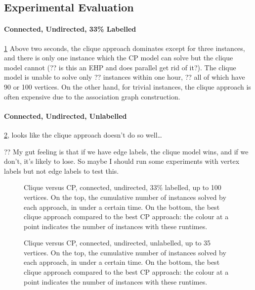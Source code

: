 \documentclass{llncs}
\begin{document}
\subsection{Experimental Evaluation}

\paragraph{Connected, Undirected, 33\% Labelled} \cref{figure:connected-undir33} Above two seconds,
    the clique approach dominates except for three instances, and there is only one instance which
    the CP model can solve but the clique model cannot (?? is this an EHP and does parallel get rid
    of it?). The clique model is unable to solve only ??  instances within one hour, ?? all of which
    have 90 or 100 vertices.  On the other hand, for trivial instances, the clique approach is often
    expensive due to the association graph construction.

\paragraph{Connected, Undirected, Unlabelled} \cref{figure:connected-plain}, looks like the clique
approach doesn't do so well\ldots

?? My gut feeling is that if we have edge labels, the clique model wins, and if we don't, it's
likely to lose. So maybe I should run some experiments with vertex labels but not edge labels to
test this.

\begin{figure}[p]
    \centering
    
    \caption{Clique versus CP, connected, undirected, 33\% labelled, up to 100 vertices. On the top,
        the cumulative number of instances solved by each approach, in under a certain time. On the
        bottom, the best clique approach compared to the best CP approach: the colour at a point
        indicates the number of instances with these runtimes.} \label{figure:connected-undir33}
\end{figure}

\begin{figure}[p]
    \centering
    
    \caption{Clique versus CP, connected, undirected, unlabelled, up to 35 vertices. On the top, the
    cumulative number of instances solved by each approach, in under a certain time. On the bottom,
    the best clique approach compared to the best CP approach: the colour at a point indicates the
    number of instances with these runtimes.}
\label{figure:connected-plain}
\end{figure}
\end{document}
